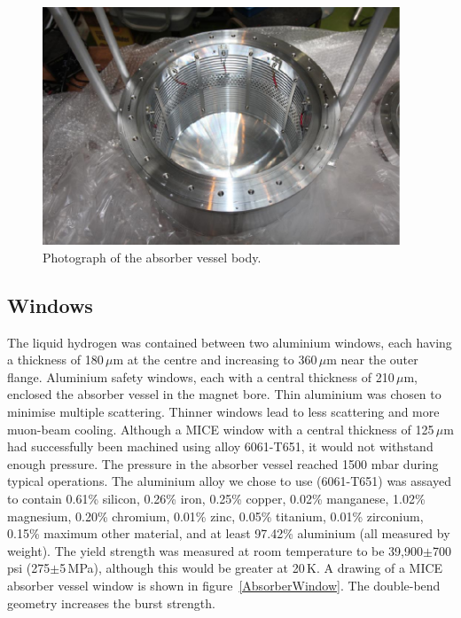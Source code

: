 \begin{figure}
  \begin{center}
    \includegraphics[width=0.95\textwidth]{Abs-Bdy-Photo.pdf}
  \end{center}
  \caption{
    Photograph of the absorber vessel body.
  }
  \label{Fig:AbsorberVessel:BdyPhoto}
\end{figure}

\subsection{Windows}
\label{SubSect:AbsorberVessel:Wndws}

The liquid hydrogen was contained between two aluminium
windows, each having a thickness of 180\,$\mu$m at the centre and
increasing to 360\,$\mu$m near the outer flange. 
Aluminium safety windows, each with a central thickness of 210\,$\mu$m,
enclosed the absorber vessel in the magnet bore.  
Thin aluminium was chosen to minimise multiple scattering.
Thinner windows lead to less scattering
and more muon-beam cooling.
Although a MICE window with a central thickness of 125\,$\mu$m had
successfully been machined using alloy 6061-T651, it  would not withstand
enough pressure. 
The pressure in the absorber vessel reached 1500 mbar during typical operations.
The aluminium alloy we chose to use (6061-T651) was assayed to contain 
 0.61\% silicon, 
 0.26\% iron,
 0.25\% copper,
 0.02\% manganese,
 1.02\% magnesium,
 0.20\% chromium,
 0.01\% zinc, 
 0.05\% titanium,
 0.01\% zirconium, 
 0.15\% maximum other material, 
and at least 97.42\% aluminium (all measured by weight). 
The yield strength was measured at room temperature to be
39,900$\pm$700\,psi (275$\pm$5\,MPa),   
although this would be greater at 20\,K. 
A drawing of a MICE absorber vessel window is shown in
figure~\ref{AbsorberWindow}. 
The double-bend geometry increases the burst strength.

